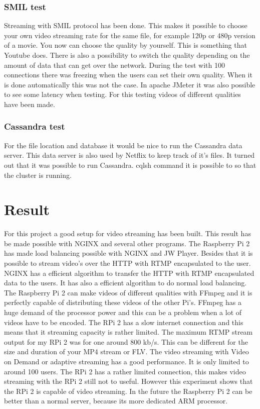 \documentclass{sig-alternate-br}
\begin{document}
\subsubsection{SMIL test}
Streaming with SMIL protocol has been done. This makes it possible to choose your own video streaming rate for the same file, for example 120p or 480p version of a movie. You now can choose the quality by yourself. This is something that Youtube does. There is also a possibility to switch the quality depending on the amount of data that can get over the network. During the test with 100 connections there was freezing when the users can set their own quality. When it is done automatically this was not the case. In apache JMeter it was also possible to see some latency when testing. For this testing videos of different qualities have been made.

\subsubsection{Cassandra test}
For the file location and database it would be nice to run the Cassandra data server. This data server is also used by Netflix to keep track of it's files. It turned out that it was possible to run Cassandra. cqlsh command it is possible to so that the cluster is running.  


\section{Result}

For this project a good setup for video streaming has been built. This result has be made possible with NGINX and several other programs. The Raspberry Pi 2 has made load balancing possible with NGINX and JW Player. Besides that it is possible to stream video's over the HTTP with RTMP encapsulated to the user. NGINX has a efficient algorithm to transfer the HTTP with RTMP encapsulated data to the users. It has also a efficient algorithm to do normal load balancing. \newline
The Raspberry Pi 2 can make videos of different qualities with FFmpeg and it is perfectly capable of distributing these videos of the other Pi's. FFmpeg has a huge demand of the processor power and this can be a problem when a lot of videos have to be encoded. 
The RPi 2 has a slow internet connection and this means that it streaming capacity is rather limited.  The maximum RTMP stream output for my RPi 2 was for one around 800 kb/s. This can be different for the size and duration of your MP4 stream or FLV. The video streaming with Video on Demand or adaptive streaming has a good performance. It is only limited to around 100 users. The RPi 2 has a rather limited connection, this makes video streaming with the RPi 2 still not to useful. However this experiment shows that the RPi 2 is capable of video streaming. In the future the Raspberry Pi 2 can be better than a normal server, because its more dedicated ARM processor. 
\end{document}

